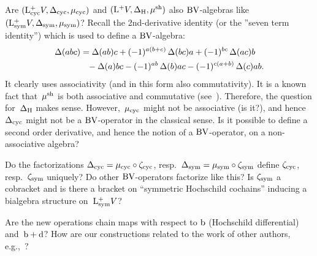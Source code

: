 \documentclass[\MainFolder/Text.tex]{subfiles}
\begin{document}
\begin{Remark}\label{Rem:OpenProbBrCo}
\begin{RemarkList}
\item Are $(\mathrm{L}^+_{\mathrm{cyc}} V, \operatorname{\Delta}_{\mathrm{cyc}}, \mu_{\mathrm{cyc}})$ and $(\mathrm{L}^+ V, \operatorname{\Delta}_{\mathrm{H}}, \mu^{\mathrm{sh}})$ also $\mathrm{BV}$-algebras like $(\mathrm{L}_{\mathrm{sym}}^+ V, \operatorname{\Delta}_{\mathrm{sym}}, \mu_{\mathrm{sym}})$? Recall the 2nd-derivative identity (or the ''seven term identity'') which is used to define a $\mathrm{BV}$-algebra:
\begin{equation}\label{Eq:secondderivative}\begin{aligned}
\operatorname{\Delta}(abc) & = \operatorname{\Delta}(ab)c + (-1)^{a(b+c)}\operatorname{\Delta}(bc)a + (-1)^{bc}\operatorname{\Delta}(ac)b \\
&\hphantom{=}{}- \operatorname{\Delta}(a)bc - (-1)^{ab}\operatorname{\Delta}(b)ac - (-1)^{c(a+b)}\operatorname{\Delta}(c)ab.
\end{aligned}\end{equation}
It clearly uses associativity (and in this form also commutativity). It is a known fact that~$\mu^{\mathrm{sh}}$ is both associative and commutative (see~\cite{LodayCyclic}). Therefore, the question for~$\operatorname{\Delta}_{\mathrm{H}}$ makes sense. However,~$\mu_{\mathrm{cyc}}$ might not be associative (is it?), and hence~$\operatorname{\Delta}_{\text{cyc}}$ might not be a $\mathrm{BV}$-operator in the classical sense. Is it possible to define a second order derivative, and hence the notion of a $\mathrm{BV}$-operator, on a non-associative algebra?
\item Do the factorizations $\operatorname{\Delta}_{\mathrm{cyc}} = \mu_{\mathrm{cyc}} \circ \zeta_{\mathrm{cyc}}$, resp.~$\operatorname{\Delta}_{\mathrm{sym}}= \mu_{\mathrm{sym}} \circ \zeta_{\mathrm{sym}}$ define $\zeta_{\mathrm{cyc}}$, resp.~$\zeta_{\mathrm{sym}}$ uniquely? Do other $\mathrm{BV}$-operators factorize like this? Is $\zeta_{\mathrm{sym}}$ a cobracket and is there a bracket on ``symmetric Hochschild cochains'' inducing a bialgebra structure on~$\mathrm{L}_{\mathrm{sym}}^+ V$? 
\item Are the new operations chain maps with respect to $\mathrm{b}$ (Hochschild differential) and~$\mathrm{b} + \mathrm{d}$? How are our constructions related to the work of other authors, e.g.,~\cite{Irie2014}? 
\qedhere
\end{RemarkList}
\end{Remark}
%
\end{document}
